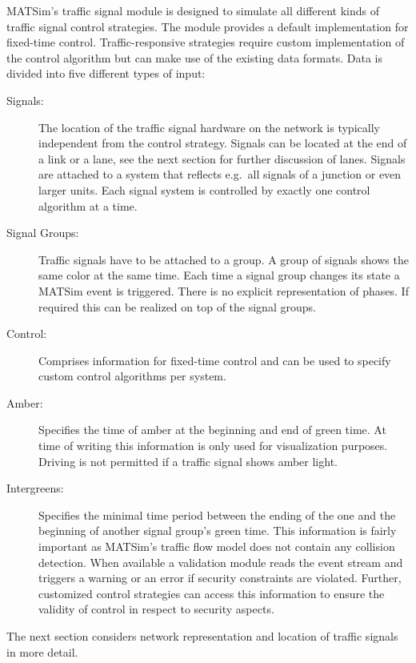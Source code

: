 MATSim's traffic signal module is designed to simulate all different kinds of traffic signal control strategies. 
The module provides a default implementation for fixed-time control. 
Traffic-responsive strategies require custom implementation of the control algorithm but can make use of the existing data formats. 
Data is divided into five different types of input:
\begin{description}
	\item[Signals:] The location of the traffic signal hardware on the network is typically independent from the control strategy. Signals can be located at the end of a link or a lane, see the next section for further discussion of lanes. Signals are attached to a system that reflects e.g.~all signals of a junction or even larger units. Each signal system is controlled by exactly one control algorithm at a time.  
	\item[Signal Groups:] Traffic signals have to be attached to a group. A group of signals shows the same color at the same time. Each time a signal group changes its state a MATSim event is triggered. 
		There is no explicit representation of phases. If required this can be realized on top of the signal groups.  
	\item[Control:] Comprises information for fixed-time control and can be used to specify custom control algorithms per system. 
	\item[Amber:] Specifies the time of amber at the beginning and end of green time. At time of writing this information is only used for visualization purposes. 
		Driving is not permitted if a traffic signal shows amber light. 
	\item[Intergreens:] Specifies the minimal time period between the ending of the one and the beginning of another signal group's green time.  
		This information is fairly important as MATSim's traffic flow model does not contain any collision detection. 
		When available a validation module reads the event stream and triggers a warning or an error if security constraints are violated. 
		Further, customized control strategies can access this information to ensure the validity of control in respect to security aspects.    
\end{description}

The next section considers network representation and location of traffic signals in more detail. 

